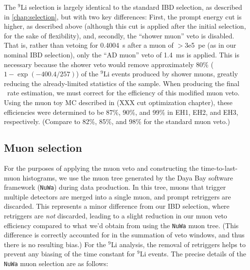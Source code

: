 \documentclass[../thesis.tex]{subfiles}
\begin{document}
The $^9$Li selection is largely identical to the standard IBD selection, as described in \autoref{chap:selection}, but with two key differences: First, the prompt energy cut is higher, as described above (although this cut is applied after the initial selection, for the sake of flexibility), and, secondly, the ``shower muon'' veto is disabled. That is, rather than vetoing for 0.4004~s after a muon of $>$3e5~pe (as in our nominal IBD selection), only the ``AD muon'' veto of 1.4~ms is applied. This is necessary because the shower veto would remove approximately 80\% ($1 - \exp(-400.4/257)$) of the $^9$Li events produced by shower muons, greatly reducing the already-limited statistics of the sample. When producing the final \linine\ rate estimation, we must correct for the efficiency of this modified muon veto. Using the muon toy MC described in (XXX cut optimization chapter), these efficiencies were determined to be 87\%, 90\%, and 99\% in EH1, EH2, and EH3, respectively. (Compare to 82\%, 85\%, and 98\% for the standard muon veto.)


\subsection{Muon selection}
\label{sec:bkgLi9MuonSel}

For the purposes of applying the muon veto and constructing the time-to-last-muon histograms, we use the muon tree generated by the Daya Bay software framework (\texttt{NuWa}) during data production. In this tree, muons that trigger multiple detectors are merged into a single muon, and prompt retriggers are discarded. This represents a minor difference from our IBD selection, where retriggers are \emph{not} discarded, leading to a slight reduction in our muon veto efficiency compared to what we'd obtain from using the \texttt{NuWa} muon tree. (This difference is correctly accounted for in the summation of veto windows, and thus there is no resulting bias.) For the $^9$Li analysis, the removal of retriggers helps to prevent any biasing of the time constant for $^9$Li events. The precise details of the \texttt{NuWa} muon selection are as follows:
\end{document}
